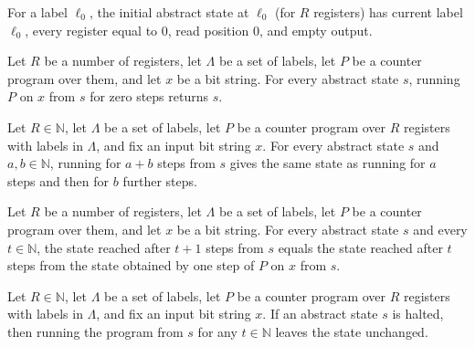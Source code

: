 \begin{definition}
\label{Complexity.CounterProg.init}
\leanok
{}
For a label $\ell_0$, the initial abstract state at $\ell_0$ (for $R$ registers) has current
label $\ell_0$, every register equal to $0$, read position $0$, and empty output.
\end{definition}

\begin{theorem}
\label{Complexity.CounterProg.run_zero}
\leanok
{}
Let $R$ be a number of registers, let $\Lambda$ be a set of labels, let $P$ be a counter
program over them, and let $x$ be a bit string. For every abstract state $s$, running
$P$ on $x$ from $s$ for zero steps returns $s$.
\end{theorem}

\begin{theorem}
\label{Complexity.CounterProg.run_add}
\leanok
{}
Let $R\in\mathbb{N}$, let $\Lambda$ be a set of labels, let $P$ be a counter program
over $R$ registers with labels in $\Lambda$, and fix an input bit string $x$. For every
abstract state $s$ and $a,b\in\mathbb{N}$, running for $a+b$ steps from $s$ gives the
same state as running for $a$ steps and then for $b$ further steps.
\end{theorem}

\begin{theorem}
\label{Complexity.CounterProg.run_succ}
\leanok
{}
Let $R$ be a number of registers, let $\Lambda$ be a set of labels, let $P$ be a counter
program over them, and let $x$ be a bit string. For every abstract state $s$ and every
$t\in\mathbb{N}$, the state reached after $t+1$ steps from $s$ equals the state reached
after $t$ steps from the state obtained by one step of $P$ on $x$ from $s$.
\end{theorem}

\begin{theorem}
\label{Complexity.CounterProg.run_of_halted}
\leanok
{}
Let $R\in\mathbb{N}$, let $\Lambda$ be a set of labels, let $P$ be a counter program
over $R$ registers with labels in $\Lambda$, and fix an input bit string $x$. If an
abstract state $s$ is halted, then running the program from $s$ for any $t\in\mathbb{N}$
leaves the state unchanged.
\end{theorem}

